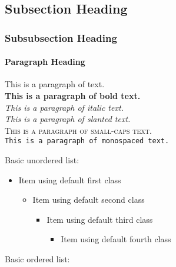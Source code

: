 \documentclass[11pt, english]{article}
\begin{document}
	\subsection{Subsection Heading}

	\subsubsection{Subsubsection Heading}

	\paragraph{Paragraph Heading}

	\newpage

	This is a paragraph of text.\\

	\textbf{This is a paragraph of bold text.}\\

	\textit{This is a paragraph of italic text.}\\

	\textsl{This is a paragraph of slanted text.}\\

	\textsc{This is a paragraph of small-caps text.}\\

	\texttt{This is a paragraph of monospaced text.}

	\newpage 

	Basic unordered list:	

	\begin{itemize}
	\setlength\itemsep{0cm}
		\item Item using default first class
		\begin{itemize}
			\item Item using default second class
			\begin{itemize}
				\item Item using default third class
				\begin{itemize}
					\item Item using default fourth class
				\end{itemize}
			\end{itemize}
		\end{itemize}
	\end{itemize}

	Basic ordered list:
\end{document}
